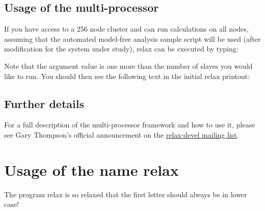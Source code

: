 
\subsection{Usage of the multi-processor}

If you have access to a 256 node cluster and can run calculations on all nodes, assuming that the  automated model-free analysis sample script will be used (after modification for the system under study), relax can be executed by typing:


Note that the argument  value is one more than the number of slaves you would like to run.  You should then see the following text in the initial relax printout:





\subsection{Further details}

For a full description of the multi-processor framework and how to use it, please see Gary Thompson's official announcement on the \href{https://mail.gna.org/public/relax-devel/2007-05/msg00000.html}{relax-devel mailing list}.




\section{Usage of the name relax}

The program relax is so relaxed that the first letter should always be in lower case!
